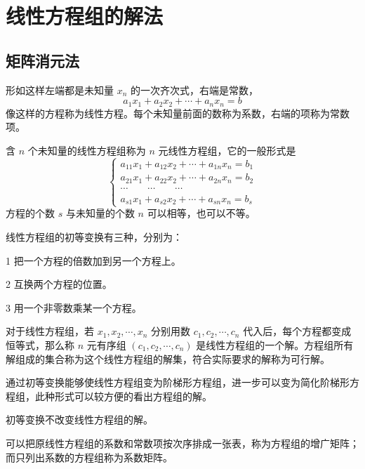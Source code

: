 \chapter{线性方程组的解法}

\section{矩阵消元法}

形如这样左端都是未知量 $x_n$ 的一次齐次式，右端是常数，
\[a_1x_1+a_2x_2+\cdots+a_nx_n=b\]
像这样的方程称为线性方程。每个未知量前面的数称为系数，右端的项称为常数项。

含 $n$ 个未知量的线性方程组称为 $n$ 元线性方程组，它的一般形式是
\begin{equation*}
	\left\{
		\begin{matrix}
			a_{11}x_1+a_{12}x_2+\cdots+a_{1n}x_n=b_1\\
			a_{21}x_1+a_{22}x_2+\cdots+a_{2n}x_n=b_2\\
			\cdots\qquad\cdots\qquad\cdots\\
			a_{s1}x_1+a_{s2}x_2+\cdots+a_{sn}x_n=b_s
		\end{matrix}
	\right.
\end{equation*}
方程的个数 $s$ 与未知量的个数 $n$ 可以相等，也可以不等。

\begin{definition}[线性方程组的初等变换]
	线性方程组的初等变换有三种，分别为：
	
	\num{1} 把一个方程的倍数加到另一个方程上。

	\num{2} 互换两个方程的位置。

	\num{3} 用一个非零数乘某一个方程。
\end{definition}

对于线性方程组，若 $x_1,x_2,\cdots,x_n$ 分别用数 $c_1,c_2,\cdots,c_n$ 代入后，每个方程都变成恒等式，那么称 $n$ 元有序组 $(c_1,c_2,\cdots,c_n)$ 是线性方程组的一个解。方程组所有解组成的集合称为这个线性方程组的解集，符合实际要求的解称为可行解。

通过初等变换能够使线性方程组变为阶梯形方程组，进一步可以变为简化阶梯形方程组，此种形式可以较方便的看出方程组的解。

\begin{theorem}
	初等变换不改变线性方程组的解。
\end{theorem}

可以把原线性方程组的系数和常数项按次序排成一张表，称为方程组的增广矩阵；而只列出系数的方程组称为系数矩阵。

